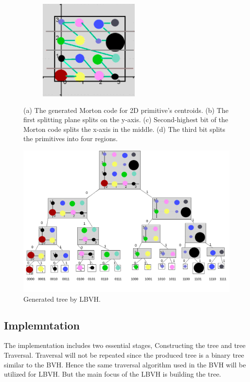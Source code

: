\documentclass[11pt,a4paper]{article}
\begin{document}
\begin{figure}[H]
             \hfill
     \begin{subfigure}[b]{0.475\textwidth}
         \centering
         \captionsetup{justification=centering}
         \includegraphics[width=5cm]{images/example_lbvh/03_g.png}
         \caption{}
         \label{fig:pi_18000}
     \end{subfigure}
        \captionsetup{justification=centering,margin=2cm}

        \caption{(a) The generated Morton code for 2D primitive's centroids. (b) The first splitting plane splits on the y-axis. (c) Second-highest bit of the Morton code splits the x-axis in the middle. (d) The third bit splits the primitives into four regions. }
        \label{fig:mortonexample}
\end{figure}



\begin{figure}[h]	
     \centering
     \captionsetup{justification=centering,margin=2cm}
     \includegraphics[width=12cm]{images/example_lbvh/tree.png}
     \caption{Generated tree by LBVH.}
     \label{fig:dice}
\end{figure}


\subsection{Implemntation}
The implementation includes two essential stages, Constructing the tree and tree Traversal. Traversal will not be repeated since the produced tree is a binary tree similar to the BVH. Hence the same traversal algorithm used in the BVH will be utilized for LBVH. But the main focus of the LBVH is building the tree.
\end{document}
